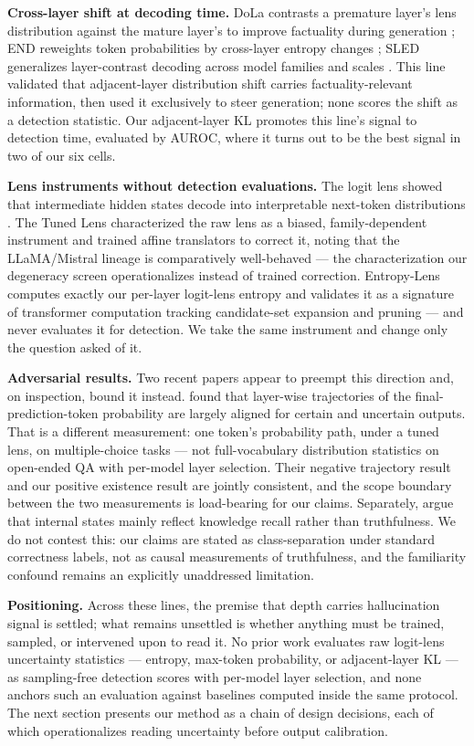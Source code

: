 \textbf{Cross-layer shift at decoding time.} DoLa contrasts a premature layer's lens distribution against the mature layer's to improve factuality during generation \citep{Chuang2023DoLa}; END reweights token probabilities by cross-layer entropy changes \citep{Wu2025Improve}; SLED generalizes layer-contrast decoding across model families and scales \citep{Zhang2024SLED}. This line validated that adjacent-layer distribution shift carries factuality-relevant information, then used it exclusively to steer generation; none scores the shift as a detection statistic. Our adjacent-layer KL promotes this line's signal to detection time, evaluated by AUROC, where it turns out to be the best signal in two of our six cells.

\textbf{Lens instruments without detection evaluations.} The logit lens showed that intermediate hidden states decode into interpretable next-token distributions \citep{nostalgebraist2020Interpreting}. The Tuned Lens characterized the raw lens as a biased, family-dependent instrument and trained affine translators to correct it, noting that the LLaMA/Mistral lineage is comparatively well-behaved \citep{Belrose2023Eliciting} --- the characterization our degeneracy screen operationalizes instead of trained correction. Entropy-Lens computes exactly our per-layer logit-lens entropy and validates it as a signature of transformer computation tracking candidate-set expansion and pruning \citep{Ali2025Entropy} --- and never evaluates it for detection. We take the same instrument and change only the question asked of it.

\textbf{Adversarial results.} Two recent papers appear to preempt this direction and, on inspection, bound it instead. \citet{Kim2025Effect} found that layer-wise trajectories of the final-prediction-token probability are largely aligned for certain and uncertain outputs. That is a different measurement: one token's probability path, under a tuned lens, on multiple-choice tasks --- not full-vocabulary distribution statistics on open-ended QA with per-model layer selection. Their negative trajectory result and our positive existence result are jointly consistent, and the scope boundary between the two measurements is load-bearing for our claims. Separately, \citet{Chi2025Know} argue that internal states mainly reflect knowledge recall rather than truthfulness. We do not contest this: our claims are stated as class-separation under standard correctness labels, not as causal measurements of truthfulness, and the familiarity confound remains an explicitly unaddressed limitation.

\textbf{Positioning.} Across these lines, the premise that depth carries hallucination signal is settled; what remains unsettled is whether anything must be trained, sampled, or intervened upon to read it. No prior work evaluates raw logit-lens uncertainty statistics --- entropy, max-token probability, or adjacent-layer KL --- as sampling-free detection scores with per-model layer selection, and none anchors such an evaluation against baselines computed inside the same protocol. The next section presents our method as a chain of design decisions, each of which operationalizes reading uncertainty before output calibration.
